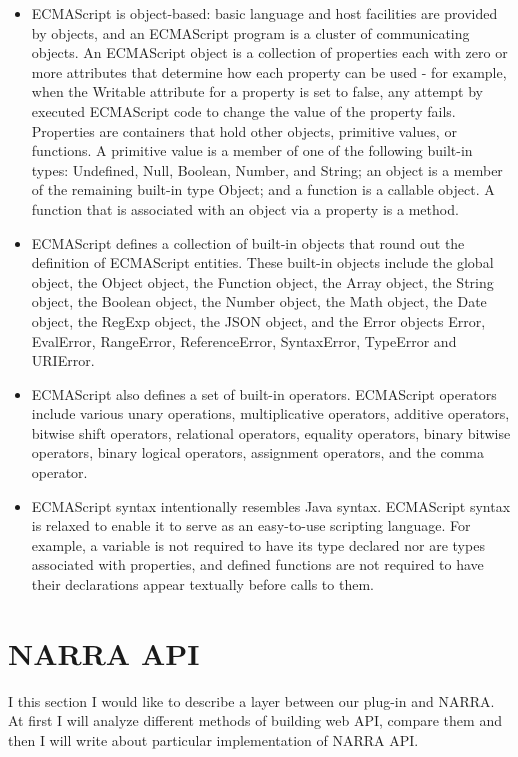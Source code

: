 \documentclass[thesis=B,english]{FITthesis}[2012/10/20]
\begin{document}
	\begin{itemize}
\item ECMAScript is object-based: basic language and host facilities are provided by objects, and an ECMAScript program is a cluster of communicating objects. An ECMAScript object is a collection of properties each with zero or more attributes that determine how each property can be used - for example, when the Writable attribute for a property is set to false, any attempt by executed ECMAScript code to change the value of the property fails. Properties are containers that hold other objects, primitive values, or functions. A primitive value is a member of one of the following built-in types: Undefined, Null, Boolean, Number, and String; an object is a member of the remaining built-in type Object; and a function is a callable object. A function that is associated with an object via a property is a method.
\item ECMAScript defines a collection of built-in objects that round out the definition of ECMAScript entities. These built-in objects include the global object, the Object object, the Function object, the Array object, the String object, the Boolean object, the Number object, the Math object, the Date object, the RegExp object, the JSON object, and the Error objects Error, EvalError, RangeError, ReferenceError, SyntaxError, TypeError and URIError.
\item ECMAScript also defines a set of built-in operators. ECMAScript operators include various unary operations, multiplicative operators, additive operators, bitwise shift operators, relational operators, equality operators, binary bitwise operators, binary logical operators, assignment operators, and the comma operator.
\item ECMAScript syntax intentionally resembles Java syntax. ECMAScript syntax is relaxed to enable it to serve as an easy-to-use scripting language. For example, a variable is not required to have its type declared nor are types associated with properties, and defined functions are not required to have their declarations appear textually before calls to them.\cite{ecma}
	\end{itemize}

\section{NARRA API}
I this section I would like to describe a layer between our plug-in and NARRA. At first I will analyze different methods of building web API, compare them and then I will write about particular implementation of NARRA API.
\end{document}
